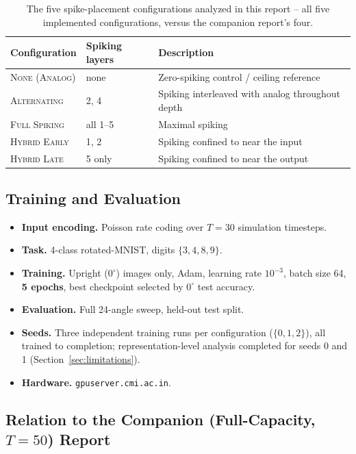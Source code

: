 \documentclass[11pt]{article}
\newcommand{\None}{\textsc{None (Analog)}}
\newcommand{\Alternating}{\textsc{Alternating}}
\newcommand{\FullSpiking}{\textsc{Full Spiking}}
\newcommand{\HybridLate}{\textsc{Hybrid Late}}
\newcommand{\HybridEarly}{\textsc{Hybrid Early}}
\begin{document}
\begin{table}[H]
\centering
\begin{tabular}{@{}lll@{}}
\toprule
\textbf{Configuration} & \textbf{Spiking layers} & \textbf{Description} \\
\midrule
\None & none & Zero-spiking control / ceiling reference \\
\Alternating & 2, 4 & Spiking interleaved with analog throughout depth \\
\FullSpiking & all 1--5 & Maximal spiking \\
\HybridEarly & 1, 2 & Spiking confined to near the input \\
\HybridLate & 5 only & Spiking confined to near the output \\
\bottomrule
\end{tabular}
\caption{The five spike-placement configurations analyzed in this report -- all five implemented
configurations, versus the companion report's four.}
\label{tab:configs}
\end{table}

\subsection{Training and Evaluation}

\begin{itemize}[leftmargin=1.5em]
\item \textbf{Input encoding.} Poisson rate coding over $T=30$ simulation timesteps.
\item \textbf{Task.} 4-class rotated-MNIST, digits $\{3,4,8,9\}$.
\item \textbf{Training.} Upright ($0^\circ$) images only, Adam, learning rate $10^{-3}$, batch size
64, \textbf{5 epochs}, best checkpoint selected by $0^\circ$ test accuracy.
\item \textbf{Evaluation.} Full 24-angle sweep, held-out test split.
\item \textbf{Seeds.} Three independent training runs per configuration ($\{0,1,2\}$), all trained to
completion; representation-level analysis completed for seeds 0 and 1 (Section~\ref{sec:limitations}).
\item \textbf{Hardware.} \texttt{gpuserver.cmi.ac.in}.
\end{itemize}

\subsection{Relation to the Companion (Full-Capacity, $T{=}50$) Report}
\end{document}

